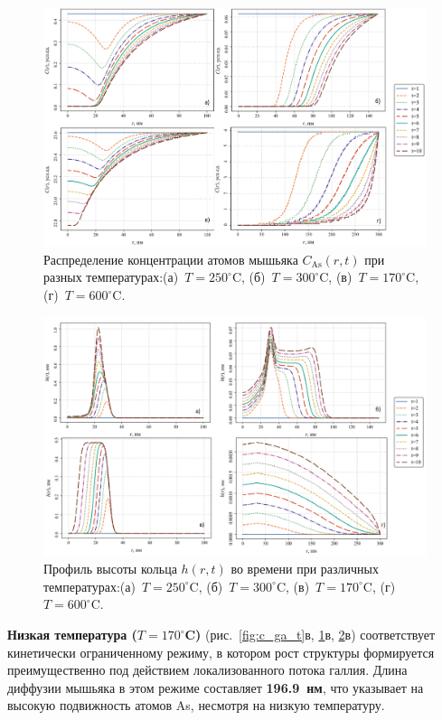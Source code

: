 \documentclass[14pt,oneside]{extarticle}
\begin{document}
\begin{figure}
    \begin{center}
    \includegraphics[width=18cm]{images/C_As_t.png}
    \caption{\label{fig:c_as_t} Распределение концентрации атомов мышьяка $C_{\text{As}}(r, t)$ при разных температурах:(а)~$T=250^\circ$C, (б)~$T=300^\circ$C, (в)~$T=170^\circ$C, (г)~$T=600^\circ$C.}
    \end{center}
\end{figure}

\begin{figure}
    \begin{center}
    \includegraphics[width=18cm]{images/h-t.png}
    \caption{\label{fig:h_t} Профиль высоты кольца $h(r, t)$ во времени при различных температурах:(а)~$T=250^\circ$C, (б)~$T=300^\circ$C, (в)~$T=170^\circ$C, (г)~$T=600^\circ$C.}
    \end{center}
\end{figure}


\textbf{Низкая температура ($T = 170^\circ$C)} (рис.~\ref{fig:c_ga_t}в, \ref{fig:c_as_t}в, \ref{fig:h_t}в) соответствует кинетически ограниченному режиму, в котором рост структуры формируется преимущественно под действием локализованного потока галлия. Длина диффузии мышьяка в этом режиме составляет \textbf{196.9~нм}, что указывает на высокую подвижность атомов As, несмотря на низкую температуру.
\end{document}
